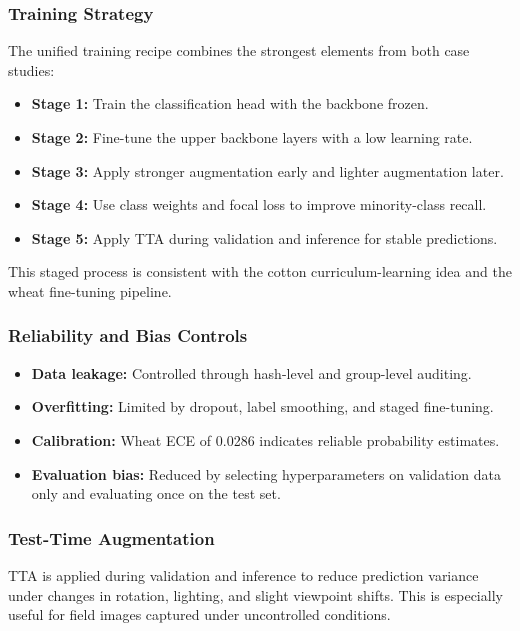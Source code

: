 \documentclass[conference]{IEEEtran}
\begin{document}
\subsubsection{Training Strategy}
The unified training recipe combines the strongest elements from both case studies:
\begin{itemize}
\item \textbf{Stage 1:} Train the classification head with the backbone frozen.
\item \textbf{Stage 2:} Fine-tune the upper backbone layers with a low learning rate.
\item \textbf{Stage 3:} Apply stronger augmentation early and lighter augmentation later.
\item \textbf{Stage 4:} Use class weights and focal loss to improve minority-class recall.
\item \textbf{Stage 5:} Apply TTA during validation and inference for stable predictions.
\end{itemize}
This staged process is consistent with the cotton curriculum-learning idea and the wheat fine-tuning pipeline.

\subsubsection{Reliability and Bias Controls}
\begin{itemize}
\item \textbf{Data leakage:} Controlled through hash-level and group-level auditing.
\item \textbf{Overfitting:} Limited by dropout, label smoothing, and staged fine-tuning.
\item \textbf{Calibration:} Wheat ECE of 0.0286 indicates reliable probability estimates.
\item \textbf{Evaluation bias:} Reduced by selecting hyperparameters on validation data only and evaluating once on the test set.
\end{itemize}

\subsubsection{Test-Time Augmentation}
TTA is applied during validation and inference to reduce prediction variance under changes in rotation, lighting, and slight viewpoint shifts. This is especially useful for field images captured under uncontrolled conditions.

\end{document}
